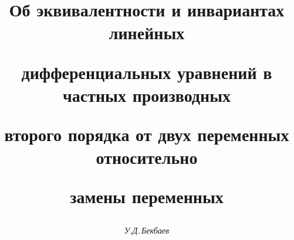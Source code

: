 

 




 


\newcommand{\st}{{\scriptstyle T}} 


\newcommand{\la}{\langle} 


\newcommand{\ra}{\rangle} 


\newcommand{\tr}{\operatorname{tr}} 


\newcommand{\tts}[1]{} 


 




  


\setcounter{page}{3} 












 


\author{\it У.Д.\,Бекбаев} 




\title{Об эквивалентности и инвариантах линейных  


дифференциальных уравнений в частных производных  


второго порядка от двух переменных относительно  


замены переменных} 


 


\date{} 




\pagestyle{plain} %


